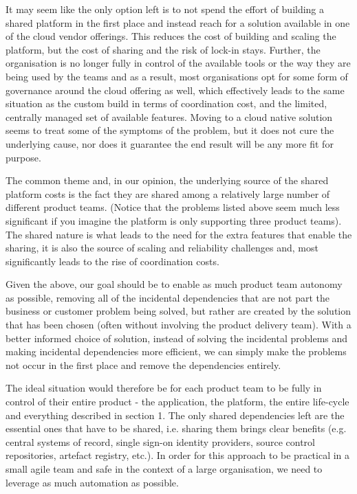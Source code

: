 \documentclass[reprint,amsmath,amssymb,aps]{revtex4-1}
\begin{document}
It may seem like the only option left is to not spend the effort of building a shared platform in the first place and instead reach for a solution available in one of the cloud vendor offerings. This reduces the cost of building and scaling the platform, but the cost of sharing and the risk of lock-in stays. Further, the organisation is no longer fully in control of the available tools or the way they are being used by the teams and as a result, most organisations opt for some form of governance around the cloud offering as well, which effectively leads to the same situation as the custom build in terms of coordination cost, and the limited, centrally managed set of available features. Moving to a cloud native solution seems to treat some of the symptoms of the problem, but it does not cure the underlying cause, nor does it guarantee the end result will be any more fit for purpose.

The common theme and, in our opinion, the underlying source of the shared platform costs is the fact they are shared among a relatively large number of different product teams. (Notice that the problems listed above seem much less significant if you imagine the platform is only supporting three product teams). The shared nature is what leads to the need for the extra features that enable the sharing, it is also the source of scaling and reliability challenges and, most significantly leads to the rise of coordination costs.

Given the above, our goal should be to enable as much product team autonomy as possible, removing all of the incidental dependencies that are not part the business or customer problem being solved, but rather are created by the solution that has been chosen (often without involving the product delivery team). With a better informed choice of solution, instead of solving the incidental problems and making incidental dependencies more efficient, we can simply make the problems not occur in the first place and remove the dependencies entirely.

The ideal situation would therefore be for each product team to be fully in control of their entire product - the application, the platform, the entire life-cycle and everything described in section 1. The only shared dependencies left are the essential ones that have to be shared, i.e. sharing them brings clear benefits (e.g. central systems of record, single sign-on identity providers, source control repositories, artefact registry, etc.). In order for this approach to be practical in a small agile team and safe in the context of a large organisation, we need to leverage as much automation as possible.
\end{document}
